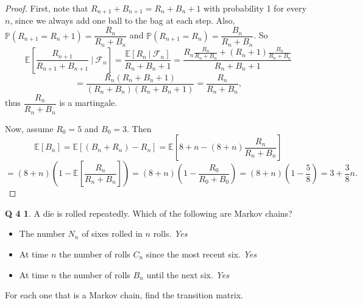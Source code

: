 \documentclass[12pt]{article}
\newcommand{\p}{\mathbb{P}}
\newcommand{\E}{\mathbb{E}}
\theoremstyle{definition}
\newtheorem*{prob4}{Q 4}
\begin{document}
\begin{proof}
First, note that $R_{n+1} + B_{n+1} = R_n + B_n + 1$ with probability 1 for every $n$, since we always add one ball to the bag at each step.  Also, $\p\left(R_{n+1} = R_n + 1\right) = \dfrac{R_n}{R_n + B_n}$ and $\p\left(R_{n+1} = R_n\right) = \dfrac{B_n}{R_n + B_n}$.  So
$$\E\left[\frac{R_{n+1}}{R_{n+1} + B_{n+1}} \ | \ \mathcal{F}_n \right] = \frac{\E\left[R_n \ | \ \mathcal{F}_n\right]}{R_n + B_n + 1} = \frac{R_n\frac{R_n}{R_n + B_n} + \left(R_n + 1\right)\frac{B_n}{R_n + B_n}}{R_n + B_n + 1}$$
$$ = \frac{R_n\left(R_n + B_n + 1\right)}{\left(R_n + B_n\right)\left(R_n + B_n + 1\right)} = \frac{R_n}{R_n + B_n},$$ thus $\dfrac{R_n}{R_n + B_n}$ is a martingale.

Now, assume $R_0 = 5$ and $B_0 = 3$.  Then
$$ \E\left[B_n\right] = \E\left[\left(B_n + R_n\right) - R_n\right] = \E\left[8+n - \left(8+n\right)\frac{R_n}{R_n+B_n}\right]$$
$$= \left(8+n\right)\left(1-\E\left[\frac{R_n}{R_n + B_n}\right]\right) = \left(8+n\right)\left(1-\frac{R_0}{R_0 + B_0}\right) = \left(8+n\right)\left(1-\frac{5}{8}\right) = 3 + \frac38 n.$$

\end{proof}

\begin{prob4}

A die is rolled repeatedly. Which of the following are Markov chains?
\begin{itemize}
\item The number $N_n$ of sixes rolled in $n$ rolls. \emph{Yes}
\item At time $n$ the number of rolls $C_n$ since the most recent six. \emph{Yes}
\item At time $n$ the number of rolls $B_n$ until the next six. \emph{Yes}
\end{itemize}
For each one that is a Markov chain, find the transition matrix.
\end{prob4}
\end{document}
